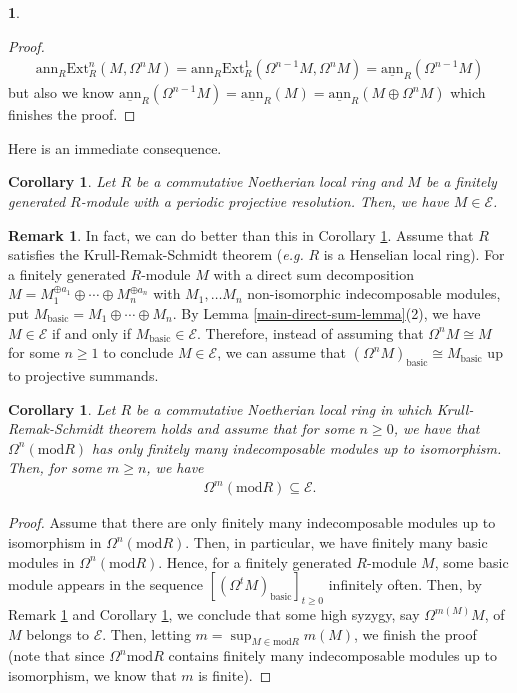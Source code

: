 \documentclass[12pt]{amsart}
\newcommand{\Ext}{\mathrm{Ext}}
\newcommand{\ann}{\mathrm{ann}}
\newcommand{\sann}{\underline{\mathrm{ann}}}
\newcommand{\module}{\mathrm{mod}}
\newcommand{\EE}{\mathcal{E}}
\newtheorem{corollary}[theorem]{Corollary}
\theoremstyle{definition}
\newtheorem{remark}[theorem]{Remark}
\newtheorem{chunk}[theorem]{}
\numberwithin{equation}{theorem}
\begin{document}
\begin{chunk}
\begin{proof}
\begin{align*}
            \ann_R\Ext_R^n(M, \Omega^n M) = \ann_R\Ext_R^1(\Omega^{n-1}M, \Omega^n M) = \sann_R(\Omega^{n-1}M)
        \end{align*}
        but also we know $\sann_R(\Omega^{n-1}M) = \sann_R(M) = \sann_R(M \oplus \Omega^n M)$ which finishes the proof.
    \end{proof}
    Here is an immediate consequence.
    \begin{corollary}\label{periodic-corollary}
        Let $R$ be a commutative Noetherian local ring and $M$ be a finitely generated $R$-module with a periodic projective resolution. Then, we have $M \in \EE$.
    \end{corollary}
    \begin{remark}\label{remark-about-periodic-modules}
        In fact, we can do better than this in Corollary \ref{periodic-corollary}. Assume that $R$ satisfies the Krull-Remak-Schmidt theorem (\textit{e.g.} $R$ is a Henselian local ring). For a finitely generated $R$-module $M$ with a direct sum decomposition $M = M_1^{\oplus a_1} \oplus \cdots \oplus M_n^{\oplus a_n}$ with $M_1, \ldots M_n$ non-isomorphic indecomposable modules, put $M_{\mathrm{basic}} = M_1 \oplus \cdots \oplus M_n$. By Lemma \ref{main-direct-sum-lemma}(2), we have $M \in \EE$ if and only if $M_{\mathrm{basic}}  \in \EE$. Therefore, instead of assuming that $\Omega^n M \cong M$ for some $n \geq 1$ to conclude $M \in \EE$, we can assume that $(\Omega^n M)_{\mathrm{basic}} \cong M_{\mathrm{basic}}$ up to projective summands.    
    \end{remark}
    \begin{corollary}\label{finite-syzygy-type-corollary}
        Let $R$ be a commutative Noetherian local ring in which Krull-Remak-Schmidt theorem holds and assume that for some $n \geq 0$, we have that $\Omega^n(\module R)$ has only finitely many indecomposable modules up to isomorphism. Then, for some $m \geq n$, we have 
        \begin{align*}
            \Omega^m(\module R) \subseteq \EE.
        \end{align*}
    \end{corollary}
    \begin{proof}
        Assume that there are only finitely many indecomposable modules up to isomorphism in $\Omega^n(\module R)$. Then, in particular, we have finitely many basic modules in $\Omega^n(\module R)$. Hence, for a finitely generated $R$-module $M$, some basic module appears in the sequence $[(\Omega^tM)_{\mathrm{basic}}]_{t \geq 0}$ infinitely often. Then, by Remark \ref{remark-about-periodic-modules} and Corollary \ref{periodic-corollary}, we conclude that some high syzygy, say $\Omega^{m(M)} M$, of $M$ belongs to $\EE$. Then, letting $m = \sup_{M \in \module R} m(M)$, we finish the proof (note that since $\Omega^n{\module R}$ contains finitely many indecomposable modules up to isomorphism, we know that $m$ is finite).  

\end{proof}
\end{chunk}
\end{document}
